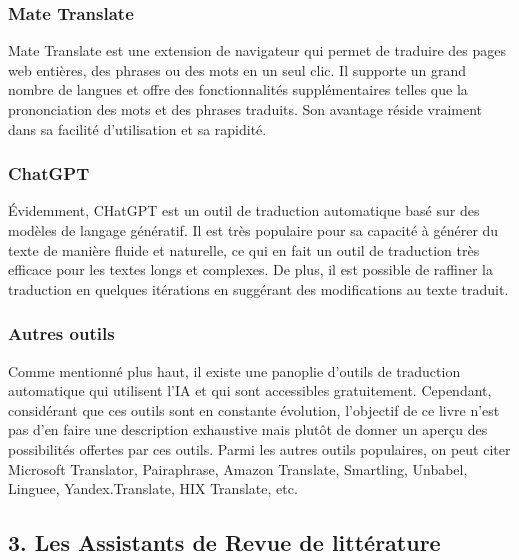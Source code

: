\documentclass[
  letterpaper,
  DIV=11,
  numbers=noendperiod]{scrreprt}
\begin{document}
\hypertarget{mate-translate}{%
\subsubsection{Mate Translate}\label{mate-translate}}

Mate Translate est une extension de navigateur qui permet de traduire
des pages web entières, des phrases ou des mots en un seul clic. Il
supporte un grand nombre de langues et offre des fonctionnalités
supplémentaires telles que la prononciation des mots et des phrases
traduits. Son avantage réside vraiment dans sa facilité d'utilisation et
sa rapidité.

\hypertarget{chatgpt}{%
\subsubsection{ChatGPT}\label{chatgpt}}

Évidemment, CHatGPT est un outil de traduction automatique basé sur des
modèles de langage génératif. Il est très populaire pour sa capacité à
générer du texte de manière fluide et naturelle, ce qui en fait un outil
de traduction très efficace pour les textes longs et complexes. De plus,
il est possible de raffiner la traduction en quelques itérations en
suggérant des modifications au texte traduit.

\hypertarget{autres-outils}{%
\subsubsection{Autres outils}\label{autres-outils}}

Comme mentionné plus haut, il existe une panoplie d'outils de traduction
automatique qui utilisent l'IA et qui sont accessibles gratuitement.
Cependant, considérant que ces outils sont en constante évolution,
l'objectif de ce livre n'est pas d'en faire une description exhaustive
mais plutôt de donner un aperçu des possibilités offertes par ces
outils. Parmi les autres outils populaires, on peut citer Microsoft
Translator, Pairaphrase, Amazon Translate, Smartling, Unbabel, Linguee,
Yandex.Translate, HIX Translate, etc.

\hypertarget{les-assistants-de-revue-de-littuxe9rature}{%
\subsection{3. Les Assistants de Revue de
littérature}\label{les-assistants-de-revue-de-littuxe9rature}}
\end{document}
